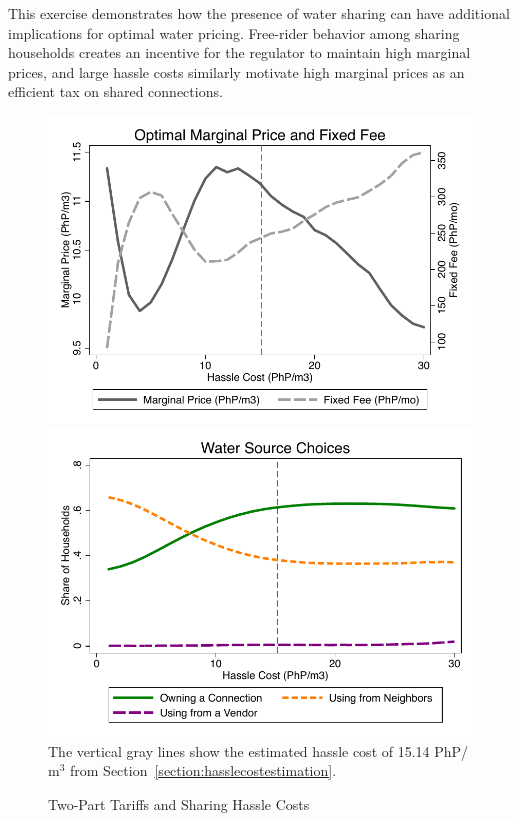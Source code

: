 \documentclass[12pt]{article}
\begin{document}
This exercise demonstrates how the presence of water sharing can have additional implications for optimal water pricing.  Free-rider behavior among sharing households creates an incentive for the regulator to maintain high marginal prices, and large hassle costs similarly motivate high marginal prices as an efficient tax on shared connections.

\begin{figure}
\caption{Two-Part Tariffs and Sharing Hassle Costs}\label{figure:tptshrcosts}
\begin{center}
\includegraphics[scale=.55,valign=t]{tables/tpt_full_graph_prices.pdf}
\includegraphics[scale=.58,valign=t]{tables/tpt_full_graph_shares.pdf}\\
{\footnotesize The vertical gray lines show the estimated hassle cost of 15.14 PhP/$\text{m}^3$ from Section~\ref{section:hasslecostestimation}.}
\end{center}
\end{figure}
\end{document}
